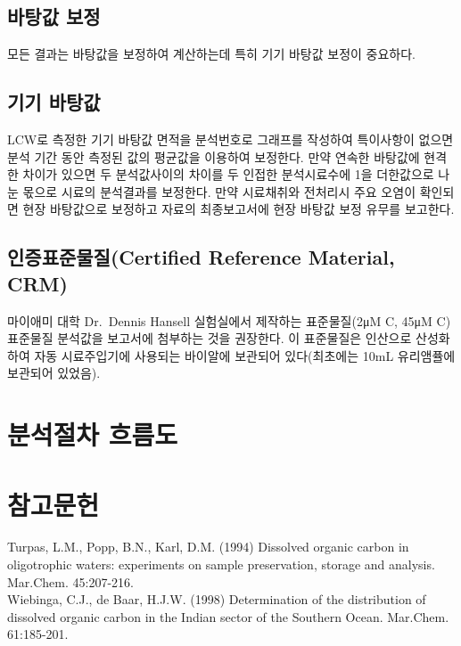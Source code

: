 \documentclass[
]{book}
\begin{document}
\hypertarget{uxbc14uxd0d5uxac12-uxbcf4uxc815}{%
\subsection{바탕값 보정}\label{uxbc14uxd0d5uxac12-uxbcf4uxc815}}

모든 결과는 바탕값을 보정하여 계산하는데 특히 기기 바탕값 보정이 중요하다.

\hypertarget{uxae30uxae30-uxbc14uxd0d5uxac12}{%
\subsection{기기 바탕값}\label{uxae30uxae30-uxbc14uxd0d5uxac12}}

LCW로 측정한 기기 바탕값 면적을 분석번호로 그래프를 작성하여 특이사항이 없으면 분석 기간 동안 측정된 값의 평균값을 이용하여 보정한다. 만약 연속한 바탕값에 현격한 차이가 있으면 두 분석값사이의 차이를 두 인접한 분석시료수에 1을 더한값으로 나눈 몫으로 시료의 분석결과를 보정한다. 만약 시료채취와 전처리시 주요 오염이 확인되면 현장 바탕값으로 보정하고 자료의 최종보고서에 현장 바탕값 보정 유무를 보고한다.

\hypertarget{uxc778uxc99duxd45cuxc900uxbb3cuxc9c8certified-reference-material-crm}{%
\subsection{인증표준물질(Certified Reference Material, CRM)}\label{uxc778uxc99duxd45cuxc900uxbb3cuxc9c8certified-reference-material-crm}}

마이애미 대학 Dr.~Dennis Hansell 실험실에서 제작하는 표준물질(2μM C, 45μM C) 표준물질 분석값을 보고서에 첨부하는 것을 권장한다. 이 표준물질은 인산으로 산성화하여 자동 시료주입기에 사용되는 바이알에 보관되어 있다(최초에는 10mL 유리앰퓰에 보관되어 있었음).

\hypertarget{uxbd84uxc11duxc808uxcc28-uxd750uxb984uxb3c4-3}{%
\section{분석절차 흐름도}\label{uxbd84uxc11duxc808uxcc28-uxd750uxb984uxb3c4-3}}

\hypertarget{uxcc38uxace0uxbb38uxd5cc-6}{%
\section{참고문헌}\label{uxcc38uxace0uxbb38uxd5cc-6}}

Turpas, L.M., Popp, B.N., Karl, D.M. (1994) Dissolved organic carbon in oligotrophic waters: experiments on sample preservation, storage and analysis. Mar.Chem. 45:207-216.\\
Wiebinga, C.J., de Baar, H.J.W. (1998) Determination of the distribution of dissolved organic carbon in the Indian sector of the Southern Ocean. Mar.Chem. 61:185-201.
\end{document}
